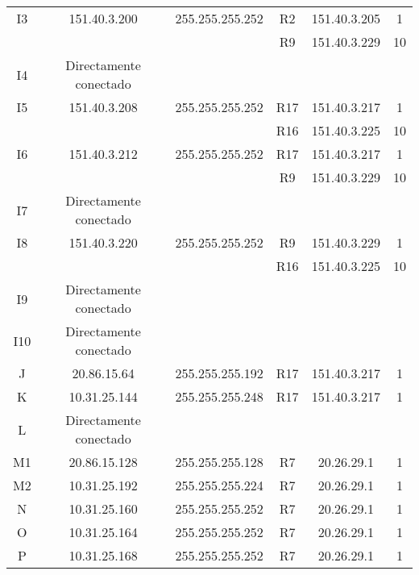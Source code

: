 \begin{tabular}{|c|c|c|c|c|c|}
 	I3 & 151.40.3.200 & 255.255.255.252 &  R2 & 151.40.3.205 & 1 \\
 		   &              &                 &  R9 & 151.40.3.229 & 10 \\
 	I4 & Directamente conectado &&&& \\
 	I5 & 151.40.3.208 & 255.255.255.252 & R17 & 151.40.3.217 & 1 \\
	   &              &                 &  R16 & 151.40.3.225 & 10 \\
 	I6 & 151.40.3.212 & 255.255.255.252 & R17 & 151.40.3.217 & 1 \\
	   &              &                 &  R9 & 151.40.3.229 & 10 \\
 	I7 & Directamente conectado &&&& \\
 	I8 & 151.40.3.220 & 255.255.255.252 & R9 & 151.40.3.229 & 1 \\
 	   &              &                 &  R16 & 151.40.3.225 & 10 \\
 	I9 & Directamente conectado &&&& \\
 	I10 & Directamente conectado &&&& \\
 	\hline
	J & 20.86.15.64 & 255.255.255.192 & R17 & 151.40.3.217 & 1\\
 	\hline
	K & 10.31.25.144 & 255.255.255.248 & R17 & 151.40.3.217 & 1\\
 	\hline
	L & Directamente conectado &&&&\\
	\hline
	M1 & 20.86.15.128 & 255.255.255.128 & R7 & 20.26.29.1 & 1\\
	\hline
	M2 & 10.31.25.192 & 255.255.255.224 & R7 & 20.26.29.1 & 1\\
	\hline
	N & 10.31.25.160 & 255.255.255.252 & R7 & 20.26.29.1& 1\\
	\hline
	O & 10.31.25.164 & 255.255.255.252 & R7 & 20.26.29.1 & 1\\
	\hline
	P & 10.31.25.168 & 255.255.255.252 & R7 & 20.26.29.1 & 1\\
	\hline
\end{tabular}


